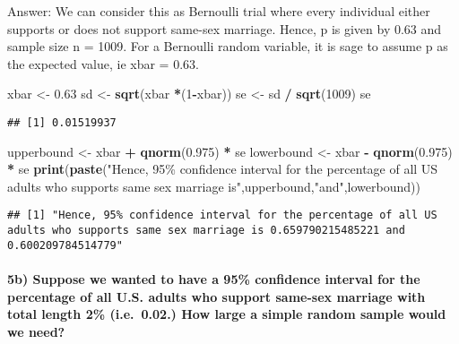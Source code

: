 \documentclass[
]{article}
\newenvironment{Shaded}{\begin{snugshade}}{\end{snugshade}}
\newcommand{\DecValTok}[1]{\textcolor[rgb]{0.00,0.00,0.81}{#1}}
\newcommand{\FloatTok}[1]{\textcolor[rgb]{0.00,0.00,0.81}{#1}}
\newcommand{\FunctionTok}[1]{\textcolor[rgb]{0.13,0.29,0.53}{\textbf{#1}}}
\newcommand{\NormalTok}[1]{#1}
\newcommand{\OtherTok}[1]{\textcolor[rgb]{0.56,0.35,0.01}{#1}}
\newcommand{\SpecialCharTok}[1]{\textcolor[rgb]{0.81,0.36,0.00}{\textbf{#1}}}
\newcommand{\StringTok}[1]{\textcolor[rgb]{0.31,0.60,0.02}{#1}}
\begin{document}
Answer: We can consider this as Bernoulli trial where every individual
either supports or does not support same-sex marriage. Hence, p is given
by 0.63 and sample size n = 1009. For a Bernoulli random variable, it is
sage to assume p as the expected value, ie xbar = 0.63.

\begin{Shaded}
\begin{Highlighting}[]
\NormalTok{xbar }\OtherTok{\textless{}{-}} \FloatTok{0.63}
\NormalTok{sd }\OtherTok{\textless{}{-}} \FunctionTok{sqrt}\NormalTok{(xbar }\SpecialCharTok{*}\NormalTok{(}\DecValTok{1}\SpecialCharTok{{-}}\NormalTok{xbar))}
\NormalTok{se }\OtherTok{\textless{}{-}}\NormalTok{ sd }\SpecialCharTok{/} \FunctionTok{sqrt}\NormalTok{(}\DecValTok{1009}\NormalTok{)}
\NormalTok{se}
\end{Highlighting}
\end{Shaded}

\begin{verbatim}
## [1] 0.01519937
\end{verbatim}

\begin{Shaded}
\begin{Highlighting}[]
\NormalTok{upperbound }\OtherTok{\textless{}{-}}\NormalTok{ xbar }\SpecialCharTok{+} \FunctionTok{qnorm}\NormalTok{(}\FloatTok{0.975}\NormalTok{) }\SpecialCharTok{*}\NormalTok{ se}
\NormalTok{lowerbound }\OtherTok{\textless{}{-}}\NormalTok{ xbar }\SpecialCharTok{{-}} \FunctionTok{qnorm}\NormalTok{(}\FloatTok{0.975}\NormalTok{) }\SpecialCharTok{*}\NormalTok{ se}
\FunctionTok{print}\NormalTok{(}\FunctionTok{paste}\NormalTok{(}\StringTok{"Hence, 95\% confidence interval for the percentage of all US adults who supports same sex marriage is"}\NormalTok{,upperbound,}\StringTok{"and"}\NormalTok{,lowerbound))}
\end{Highlighting}
\end{Shaded}

\begin{verbatim}
## [1] "Hence, 95% confidence interval for the percentage of all US adults who supports same sex marriage is 0.659790215485221 and 0.600209784514779"
\end{verbatim}

\hypertarget{b-suppose-we-wanted-to-have-a-95-confidence-interval-for-the-percentage-of-all-u.s.-adults-who-support-same-sex-marriage-with-total-length-2-i.e.-0.02.-how-large-a-simple-random-sample-would-we-need}{%
\paragraph{5b) Suppose we wanted to have a 95\% confidence interval for
the percentage of all U.S. adults who support same-sex marriage with
total length 2\% (i.e.~0.02.) How large a simple random sample would we
need?}\label{b-suppose-we-wanted-to-have-a-95-confidence-interval-for-the-percentage-of-all-u.s.-adults-who-support-same-sex-marriage-with-total-length-2-i.e.-0.02.-how-large-a-simple-random-sample-would-we-need}}
\end{document}
